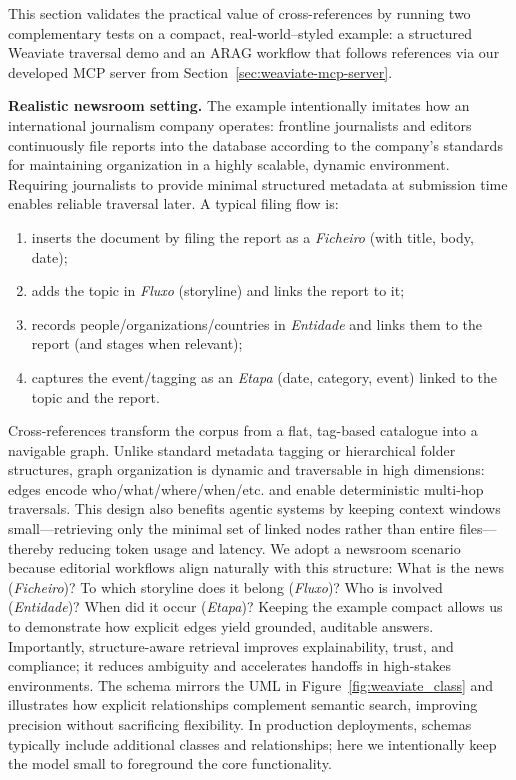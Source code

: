 This section validates the practical value of cross-references by running two complementary tests on a compact, real-world–styled example: a structured Weaviate traversal demo and an \gls{ARAG} workflow that follows references via our developed \gls{MCP} server from Section~\ref{sec:weaviate-mcp-server}. 

 
\noindent\textbf{Realistic newsroom setting.} The example intentionally imitates how an international journalism company operates: frontline journalists and editors continuously file reports into the database according to the company's standards for maintaining organization in a highly scalable, dynamic environment. Requiring journalists to provide minimal structured metadata at submission time enables reliable traversal later. A typical filing flow is:
\begin{enumerate}
    \item inserts the document by filing the report as a \textit{Ficheiro} (with title, body, date);
    \item adds the topic in \textit{Fluxo} (storyline) and links the report to it;
    \item records people/organizations/countries in \textit{Entidade} and links them to the report (and stages when relevant);
    \item captures the event/tagging as an \textit{Etapa} (date, category, event) linked to the topic and the report.
\end{enumerate}

Cross-references transform the corpus from a flat, tag-based catalogue into a navigable graph. Unlike standard metadata tagging or hierarchical folder structures, graph organization is dynamic and traversable in high dimensions: edges encode who/what/where/when/etc. and enable deterministic multi-hop traversals. This design also benefits agentic systems by keeping context windows small—retrieving only the minimal set of linked nodes rather than entire files—thereby reducing token usage and latency. We adopt a newsroom scenario because editorial workflows align naturally with this structure: What is the news (\textit{Ficheiro})? To which storyline does it belong (\textit{Fluxo})? Who is involved (\textit{Entidade})? When did it occur (\textit{Etapa})? Keeping the example compact allows us to demonstrate how explicit edges yield grounded, auditable answers. Importantly, structure-aware retrieval improves explainability, trust, and compliance; it reduces ambiguity and accelerates handoffs in high-stakes environments. The schema mirrors the UML in Figure~\ref{fig:weaviate_class} and illustrates how explicit relationships complement semantic search, improving precision without sacrificing flexibility. In production deployments, schemas typically include additional classes and relationships; here we intentionally keep the model small to foreground the core functionality.

